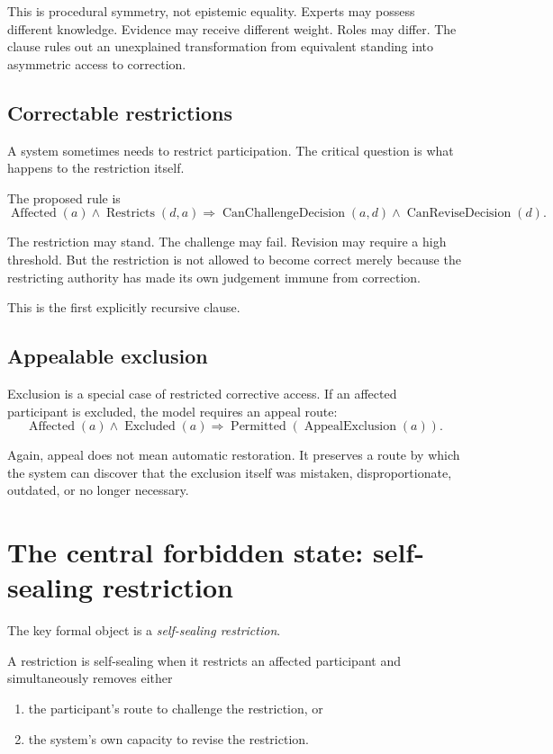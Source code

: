 \documentclass[11pt,a4paper]{article}
\begin{document}
This is procedural symmetry, not epistemic equality. Experts may possess different knowledge. Evidence may receive different weight. Roles may differ. The clause rules out an unexplained transformation from equivalent standing into asymmetric access to correction.

\subsection{Correctable restrictions}

A system sometimes needs to restrict participation. The critical question is what happens to the restriction itself.

The proposed rule is
\[
\operatorname{Affected}(a)
\land
\operatorname{Restricts}(d,a)
\Rightarrow
\operatorname{CanChallengeDecision}(a,d)
\land
\operatorname{CanReviseDecision}(d).
\]

The restriction may stand. The challenge may fail. Revision may require a high threshold. But the restriction is not allowed to become correct merely because the restricting authority has made its own judgement immune from correction.

This is the first explicitly recursive clause.

\subsection{Appealable exclusion}

Exclusion is a special case of restricted corrective access. If an affected participant is excluded, the model requires an appeal route:
\[
\operatorname{Affected}(a)
\land
\operatorname{Excluded}(a)
\Rightarrow
\operatorname{Permitted}(\operatorname{AppealExclusion}(a)).
\]

Again, appeal does not mean automatic restoration. It preserves a route by which the system can discover that the exclusion itself was mistaken, disproportionate, outdated, or no longer necessary.

\section{The central forbidden state: self-sealing restriction}

The key formal object is a \emph{self-sealing restriction}.

A restriction is self-sealing when it restricts an affected participant and simultaneously removes either
\begin{enumerate}
  \item the participant's route to challenge the restriction, or
  \item the system's own capacity to revise the restriction.
\end{enumerate}
\end{document}
